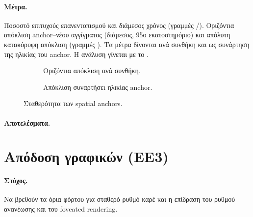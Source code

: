 \paragraph{Μέτρα.} Ποσοστό επιτυχούς επανεντοπισμού και διάμεσος χρόνος (γραμμές /). Οριζόντια απόκλιση anchor--νέου αγγίγματος (διάμεσος, 95ο εκατοστημόριο) και απόλυτη κατακόρυφη απόκλιση (γραμμές ). Τα μέτρα δίνονται ανά συνθήκη και ως συνάρτηση της ηλικίας του anchor. Η ανάλυση γίνεται με το .

\begin{table}[htbp]
  \centering\small
  \caption{Επανεντοπισμός και απόκλιση anchors ανά συνθήκη.}
  \label{tab:anchors-by-condition}
\end{table}

\begin{figure}[htbp]
  \centering
  \begin{subfigure}{0.49\linewidth}
    \caption{Οριζόντια απόκλιση ανά συνθήκη.}
  \end{subfigure}\hfill
  \begin{subfigure}{0.49\linewidth}
    \caption{Απόκλιση συναρτήσει ηλικίας anchor.}
  \end{subfigure}
  \caption{Σταθερότητα των spatial anchors.}
  \label{fig:anchors}
\end{figure}

\paragraph{Αποτελέσματα.}\mbox{}


\section{Απόδοση γραφικών (ΕΕ3)}
\label{sec:exp-performance}

\paragraph{Στόχος.} Να βρεθούν τα όρια φόρτου για σταθερό ρυθμό καρέ και η επίδραση του ρυθμού ανανέωσης και του foveated rendering.

